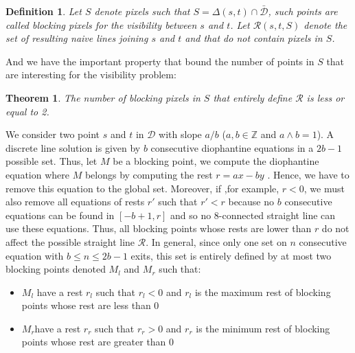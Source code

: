 \documentclass{llncs}
\newtheorem{defi}{Definition}
\newtheorem{theo}{Theorem}
\begin{document}
\begin{defi}
Let $S$ denote pixels such that $S=\Delta(s,t)\cap\bar{\mathcal{D}}$, such points are called {\it blocking
  pixels} for the visibility between $s$ and $t$. Let $\mathcal{R}(s,t,S)$ denote the set of
resulting naive lines joining $s$ and $t$ and that do not contain pixels in $S$.
\end{defi}

And we have the important property that bound the number of points in $S$ that are interesting for
the visibility problem:

\begin{theo}
  The number of blocking pixels in $S$ that entirely define $\mathcal{R}$ is less or equal to 2.
\end{theo}


 We consider two point $s$ and $t$ in $\mathcal{D}$ with slope $a/b$ ($a,b \in
\mathbb{Z}$ and $a\wedge b=1$). A discrete line solution is given by $b$ consecutive diophantine
equations in a  $2b-1$ possible set. Thus, let $M$ be a blocking point, we compute the diophantine
equation where $M$ belongs by computing the rest $r=ax-by$ \cite{debled}. Hence, we have to remove
this equation to the global set. Moreover, if ,for example, $r<0$, we must also remove all equations of rests $r'$
such that $r'<r$ because no $b$ consecutive equations can be found in $[-b+1,r]$ and so no
8-connected straight line can use these equations. Thus, all blocking points whose rests are lower
than $r$ do not affect the possible straight line $\mathcal{R}$. In general, since only one set on
$n$ consecutive equation with $b\leq n\leq 2b-1$ exits, this set is entirely defined by at most two blocking
points denoted $M_l$ and $M_r$ such that:
\begin{itemize}
\item $M_l$ have a rest $r_l$ such that $r_l<0$ and $r_l$ is the maximum rest of blocking points
  whose rest are less than 0 
\item $M_r$have a rest $r_r$ such that $r_r>0$ and $r_r$ is the minimum rest of blocking points
  whose rest are greater than 0
\end{itemize}
\end{document}
